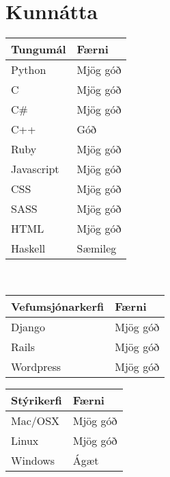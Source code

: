 \documentclass{cv_styles}
\begin{document}
\section{Kunnátta}
\begin{tabularx}{\textwidth}{X|l}
    \textbf{Tungumál} & \textbf{Færni} \\
\hline
Python & Mjög góð \\
C & Mjög góð \\
C\# & Mjög góð \\
C++  & Góð \\
Ruby & Mjög góð \\
Javascript & Mjög góð \\
CSS & Mjög góð \\
SASS & Mjög góð \\
HTML & Mjög góð \\
Haskell & Sæmileg \\
\end{tabularx} \\
\bigbreak
\noindent
\begin{tabularx}{\textwidth}{X|l}
    \textbf{Vefumsjónarkerfi} & \textbf{Færni} \\
\hline
Django & Mjög góð \\
Rails & Mjög góð \\
Wordpress & Mjög góð
\end{tabularx}
\bigbreak
\noindent
\begin{tabularx}{\textwidth}{X|l}
    \textbf{Stýrikerfi} & \textbf{Færni} \\
\hline
Mac/OSX & Mjög góð \\
Linux & Mjög góð \\
Windows & Ágæt \\
\end{tabularx}
\end{document}
